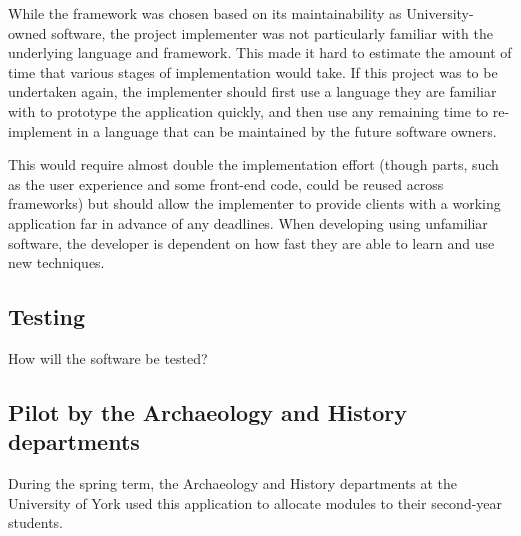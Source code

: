 \documentclass[]{scrartcl}
\begin{document}






While the framework was chosen based on its maintainability as
University-owned software, the project implementer was not particularly
familiar with the underlying language and framework. This made it hard to
estimate the amount of time that various stages of implementation would take.
If this project was to be undertaken again, the implementer should first use a
language they are familiar with to prototype the application quickly, and then
use any remaining time to re-implement in a language that can be maintained by
the future software owners.

This would require almost double the implementation effort (though parts, such
as the user experience and some front-end code, could be reused across
frameworks) but should allow the implementer to provide clients with a working
application far in advance of any deadlines. When developing using unfamiliar
software, the developer is dependent on how fast they are able to learn and
use new techniques.

\subsection{Testing}

How will the software be tested?

\subsection{Pilot by the Archaeology and History departments}

During the spring term, the Archaeology and History departments at the
University of York used this application to allocate modules to their
second-year students.
\end{document}
